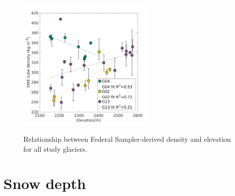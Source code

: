 \documentclass[12pt]{article}
\begin{document}
\begin{figure}[H]
	\centering
	\includegraphics[width = 0.6\textwidth]{ElevationVsSWEtube_all.png}\\
	\caption{Relationship between Federal Sampler-derived density and elevation for all study glaciers.}
	\label{fig:elev_tube}
\end{figure}


\pagebreak

\section{Snow depth}
\end{document}
